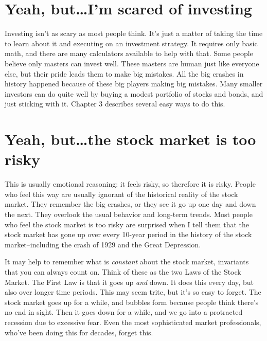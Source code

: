 \section{Yeah, but\ldots I'm scared of investing}
Investing isn't as scary as most people think. It's just a matter of taking the time to learn about it and executing on an investment strategy. It requires only basic math, and there are many calculators available to help with that. Some people believe only masters can invest well. These masters are human just like everyone else, but their pride leads them to make big mistakes. All the big crashes in history happened because of these big players making big mistakes. Many smaller investors can do quite well by buying a modest portfolio of stocks and bonds, and just sticking with it. Chapter 3 describes several easy ways to do this.

\section{Yeah, but\ldots the stock market is too risky}
This is usually emotional reasoning: it feels risky, so therefore it is risky. People who feel this way are usually ignorant of the historical reality of the stock market. They remember the big crashes, or they see it go up one day and down the next. They overlook the usual behavior and long-term trends. Most people who feel the stock market is too risky are surprised when I tell them that the stock market has gone up over every 10-year period in the history of the stock market–including the crash of 1929 and the Great Depression.

It may help to remember what is \emph{constant} about the stock market, invariants that you can always count on. Think of these as the two Laws of the Stock Market. The First Law is that it goes up \emph{and} down. It does this every day, but also over longer time periods. This may seem trite, but it's so easy to forget. The stock market goes up for a while, and bubbles form because people think there's no end in sight. Then it goes down for a while, and we go into a protracted recession due to excessive fear. Even the most sophisticated market professionals, who've been doing this for decades, forget this.

